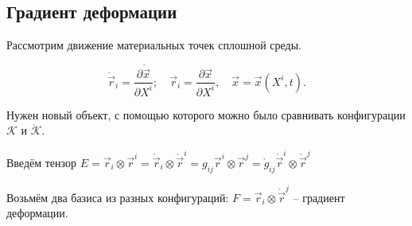 

\subsection{Градиент деформации}

Рассмотрим движение материальных точек сплошной среды.

\[
  \mathring{\vec{r}}_i = \dfrac{\partial \mathring{\vec{x}}}{\partial X^i};
  \quad 
  \vec{r}_i = \dfrac{\partial \vec{x}}{\partial X^i},
  \quad
  \vec{x} = \vec{x}(X^i, t).
\]

Нужен новый объект, с помощью которого можно было сравнивать конфигурации $\mathcal{K}$ и $\mathring{\mathcal{K}}$.

Введём тензор $E = \vec{r}_i \otimes \vec{r}^i
= \mathring{\vec{r}}_i \otimes \mathring{\vec{r}}^i
= g_{ij} \vec{r}^i \otimes \vec{r}^j = \mathring{g}_{ij} \mathring{\vec{r}}^i \otimes \mathring{\vec{r}}^j$

Возьмём два базиса из разных конфигураций: $F = \vec{r}_i \otimes \mathring{\vec{r}}^j$ -- градиент деформации.

